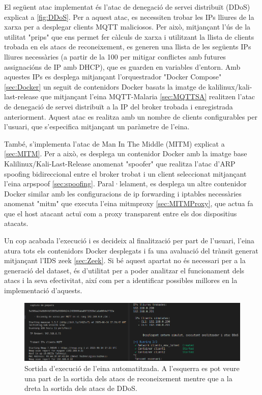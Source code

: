 El següent atac implementat és l'atac de denegació de servei distribuït (DDoS) explicat a \ref{fig:DDoS}. Per a aquest atac, es necessiten trobar les IPs lliures de la xarxa per a desplegar clients MQTT maliciosos. Per això, mitjançant l'ús de la utilitat "prips" que ens permet fer càlculs de xarxa i utilitzant la llista de clients trobada en els atacs de reconeixement, es generen una llista de les següents IPs lliures necessàries (a partir de la 100 per mitigar conflictes amb futures assignacións de IP amb DHCP), que es guarden en variables d'entorn. Amb aquestes IPs es desplega mitjançant l'orquestrador "Docker Compose" \ref{sec:Docker} un seguit de contenidors Docker basats la imatge de kalilinux/kali-last-release que mitjançant l'eina MQTT-Malaria \ref{sec:MQTTSA} realitzen l'atac de denegació de servei distribuït a la IP del broker trobada i enregistrada anteriorment. Aquest atac es realitza amb un nombre de clients configurables per l'usuari, que s'especifica mitjançant un paràmetre de l'eina.

També, s'implementa l'atac de Man In The Middle (MITM) explicat a \ref{sec:MITM}. Per a això, es desplega un contenidor Docker amb la imatge base Kalilinux/Kali-Last-Release anomenat "spoofer" que realitza l'atac d'ARP spoofing bidireccional entre el broker trobat i un client seleccionat mitjançant l'eina arpspoof \ref{sec:spoofing}. Paral·lelament, es desplega un altre contenidor Docker similar amb les configuracions de ip forwarding i iptables necessàries anomenat "mitm" que executa l'eina mitmproxy \ref{sec:MITMProxy}, que actua fa que el host atacant actuï com a proxy transparent entre els dos dispositius atacats.

Un cop acabada l'execució i es decideix al finalització per part de l'usuari, l'eina atura tots els contenidors Docker desplegats i fa una avaluació del trànsit generat mitjançant l'IDS zeek \ref{sec:Zeek}. Si bé aquest apartat no és necessari per a la generació del dataset, és d'utilitat per a poder analitzar el funcionament dels atacs i la seva efectivitat, així com per a identificar possibles millores en la implementació d'aquests.

  \begin{figure}[H]
    \centering
    \includegraphics[width=1\textwidth]{img/tool.png}
    \caption{Sortida d'execució de l'eina automatitzada. A l'esquerra es pot veure una part de la sortida dels atacs de reconeixement mentre que a la dreta la sortida dels atacs de DDoS.}
    \label{fig:tool}
  \end{figure}


\